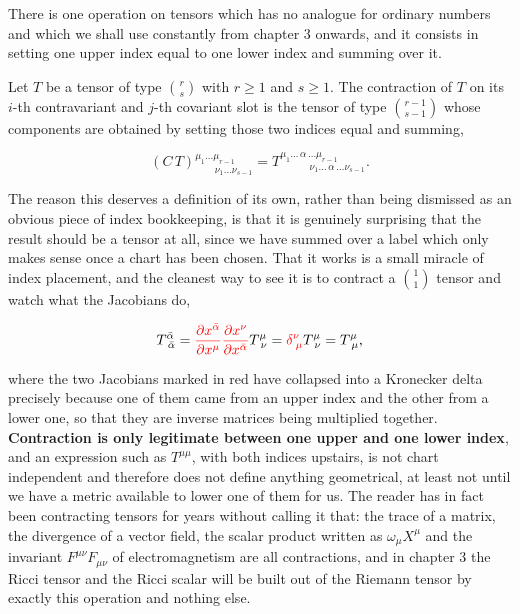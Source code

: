         There is one operation on tensors which has no analogue for ordinary numbers and which we shall use constantly from chapter 3 onwards, and it consists in setting one upper index equal to one lower index and summing over it.

        \begin{myDef}
            Let $T$ be a tensor of type $\binom{r}{s}$ with $r \geq 1$ and $s \geq 1$. The contraction of $T$ on its $i$-th contravariant and $j$-th covariant slot is the tensor of type $\binom{r-1}{s-1}$ whose components are obtained by setting those two indices equal and summing,

            \begin{equation}
                \left(C\,T\right)^{\mu_1...\mu_{r-1}}_{\qquad\nu_1...\nu_{s-1}} = T^{\mu_1...\,\alpha\,...\mu_{r-1}}_{\qquad\quad\nu_1...\,\alpha\,...\nu_{s-1}}.
            \end{equation}
        \end{myDef}

        The reason this deserves a definition of its own, rather than being dismissed as an obvious piece of index bookkeeping, is that it is genuinely surprising that the result should be a tensor at all, since we have summed over a label which only makes sense once a chart has been chosen. That it works is a small miracle of index placement, and the cleanest way to see it is to contract a $\binom{1}{1}$ tensor and watch what the Jacobians do,

        \begin{align*}
            T^{\Bar{\alpha}}_{\;\Bar{\alpha}} = {\color{red}\frac{\partial x^{\Bar{\alpha}}}{\partial x^{\mu}}\frac{\partial x^{\nu}}{\partial x^{\Bar{\alpha}}}}T^{\mu}_{\;\nu} = {\color{red}\delta^{\nu}_{\;\mu}}T^{\mu}_{\;\nu} = T^{\mu}_{\;\mu},
        \end{align*}

        where the two Jacobians marked in red have collapsed into a Kronecker delta precisely because one of them came from an upper index and the other from a lower one, so that they are inverse matrices being multiplied together. \textbf{Contraction is only legitimate between one upper and one lower index}, and an expression such as $T^{\mu\mu}$, with both indices upstairs, is not chart independent and therefore does not define anything geometrical, at least not until we have a metric available to lower one of them for us. The reader has in fact been contracting tensors for years without calling it that: the trace of a matrix, the divergence of a vector field, the scalar product written as $\omega_{\mu}X^{\mu}$ and the invariant $F^{\mu\nu}F_{\mu\nu}$ of electromagnetism are all contractions, and in chapter 3 the Ricci tensor and the Ricci scalar will be built out of the Riemann tensor by exactly this operation and nothing else.

